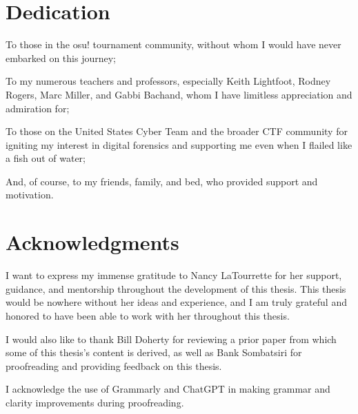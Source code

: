 \documentclass[letterpaper,12pt]{report}
\begin{document}


\section*{Dedication}

To those in the osu! tournament community, without whom I would have
never embarked on this journey;

To my numerous teachers and professors, especially Keith Lightfoot,
Rodney Rogers, Marc Miller, and Gabbi Bachand, whom I have limitless
appreciation and admiration for;

To those on the United States Cyber Team and the broader CTF
community for igniting my interest in digital forensics and supporting
me even when I flailed like a fish out of water;

And, of course, to my friends, family, and bed, who provided support and motivation.


\newpage

\section*{Acknowledgments}

I want to express my immense gratitude to Nancy LaTourrette for her
support, guidance, and mentorship throughout the development of this
thesis. This thesis would be nowhere without her ideas and experience,
and I am truly grateful and honored to have been able to work with her
throughout this thesis.

I would also like to thank Bill Doherty for reviewing a prior paper
from which some of this thesis's content is derived, as well as Bank Sombatsiri
for proofreading and providing feedback on this thesis.

I acknowledge the use of Grammarly and ChatGPT in making grammar and clarity
improvements during proofreading.


\newpage
\renewcommand*\contentsname{Table of Contents}
\tableofcontents

\newpage
\listoftables

\newpage
\listoffigures
\end{document}
